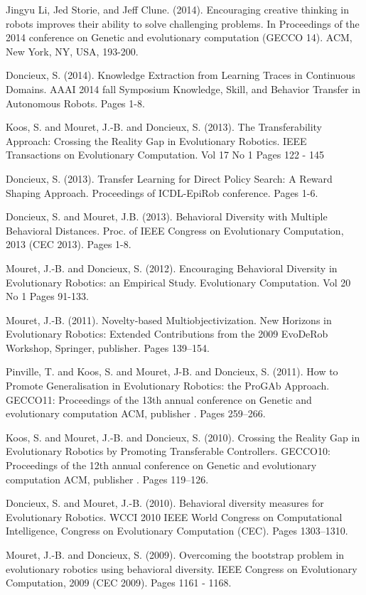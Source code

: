 \begin{DoxyItemize}
\item Jingyu Li, Jed Storie, and Jeff Clune. (2014). Encouraging creative thinking in robots improves their ability to solve challenging problems. In Proceedings of the 2014 conference on Genetic and evolutionary computation (G\+E\+C\+CO \textquotesingle{}14). A\+CM, New York, NY, U\+SA, 193-\/200.
\item Doncieux, S. (2014). Knowledge Extraction from Learning Traces in Continuous Domains. A\+A\+AI 2014 fall Symposium \textquotesingle{}\textquotesingle{}Knowledge, Skill, and Behavior Transfer in Autonomous Robots\textquotesingle{}\textquotesingle{}. Pages 1-\/8.
\item Koos, S. and Mouret, J.-\/B. and Doncieux, S. (2013). The Transferability Approach\+: Crossing the Reality Gap in Evolutionary Robotics. I\+E\+EE Transactions on Evolutionary Computation. Vol 17 No 1 Pages 122 -\/ 145
\item Doncieux, S. (2013). Transfer Learning for Direct Policy Search\+: A Reward Shaping Approach. Proceedings of I\+C\+D\+L-\/\+Epi\+Rob conference. Pages 1-\/6.
\item Doncieux, S. and Mouret, J.\+B. (2013). Behavioral Diversity with Multiple Behavioral Distances. Proc. of I\+E\+EE Congress on Evolutionary Computation, 2013 (C\+EC 2013). Pages 1-\/8.
\item Mouret, J.-\/B. and Doncieux, S. (2012). Encouraging Behavioral Diversity in Evolutionary Robotics\+: an Empirical Study. Evolutionary Computation. Vol 20 No 1 Pages 91-\/133.
\item Mouret, J.-\/B. (2011). Novelty-\/based Multiobjectivization. New Horizons in Evolutionary Robotics\+: Extended Contributions from the 2009 Evo\+De\+Rob Workshop, Springer, publisher. Pages 139--154.
\item Pinville, T. and Koos, S. and Mouret, J-\/B. and Doncieux, S. (2011). How to Promote Generalisation in Evolutionary Robotics\+: the Pro\+G\+Ab Approach. G\+E\+C\+CO\textquotesingle{}11\+: Proceedings of the 13th annual conference on Genetic and evolutionary computation A\+CM, publisher . Pages 259--266.
\item Koos, S. and Mouret, J.-\/B. and Doncieux, S. (2010). Crossing the Reality Gap in Evolutionary Robotics by Promoting Transferable Controllers. G\+E\+C\+CO\textquotesingle{}10\+: Proceedings of the 12th annual conference on Genetic and evolutionary computation A\+CM, publisher . Pages 119--126.
\item Doncieux, S. and Mouret, J.-\/B. (2010). Behavioral diversity measures for Evolutionary Robotics. W\+C\+CI 2010 I\+E\+EE World Congress on Computational Intelligence, Congress on Evolutionary Computation (C\+EC). Pages 1303--1310.
\item Mouret, J.-\/B. and Doncieux, S. (2009). Overcoming the bootstrap problem in evolutionary robotics using behavioral diversity. I\+E\+EE Congress on Evolutionary Computation, 2009 (C\+EC 2009). Pages 1161 -\/ 1168.
\end{DoxyItemize}

